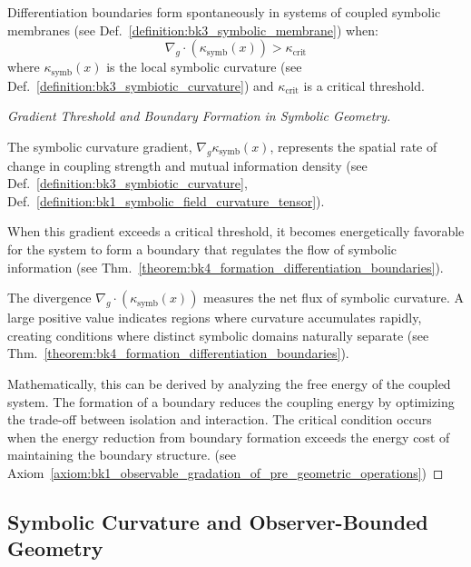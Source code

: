 \begin{theorem} \label{theorem:bk4_formation_differentiation_boundaries}
Differentiation boundaries form spontaneously in systems of coupled symbolic membranes (see Def.~\ref{definition:bk3_symbolic_membrane}) when:
\begin{equation}
    \nabla_g \cdot (\kappa_{\text{symb}}(x)) > \kappa_{\text{crit}}
\end{equation}
where $\kappa_{\text{symb}}(x)$ is the local symbolic curvature (see Def.~\ref{definition:bk3_symbiotic_curvature}) and $\kappa_{\text{crit}}$ is a critical threshold.
\end{theorem}
\begin{proof}[Gradient Threshold and Boundary Formation in Symbolic Geometry]
\label{proof:bk4_symbolic_curvature_boundary}
\leavevmode

The symbolic curvature gradient,
$\nabla_g \kappa_{\text{symb}}(x)$, represents the spatial rate
of change in coupling strength and mutual information density
(see Def.~\ref{definition:bk3_symbiotic_curvature}, Def.~\ref{definition:bk1_symbolic_field_curvature_tensor}).

When this gradient exceeds a critical threshold, it becomes 
energetically favorable for the system to form a boundary 
that regulates the flow of symbolic information (see 
Thm.~\ref{theorem:bk4_formation_differentiation_boundaries}).

The divergence $\nabla_g \cdot (\kappa_{\text{symb}}(x))$ measures the net flux of symbolic curvature. A large positive value indicates regions where curvature accumulates rapidly, creating conditions where distinct symbolic domains naturally separate (see Thm.~\ref{theorem:bk4_formation_differentiation_boundaries}).

Mathematically, this can be derived by analyzing the free energy of the coupled system. The formation of a boundary reduces the coupling energy by optimizing the trade-off between isolation and interaction. The critical condition occurs when the energy reduction from boundary formation exceeds the energy cost of maintaining the boundary structure. (see Axiom~\ref{axiom:bk1_observable_gradation_of_pre_geometric_operations})
\end{proof}
\subsection{Symbolic Curvature and Observer-Bounded Geometry}
\label{subsec:bk4_symbolic_curvature}

